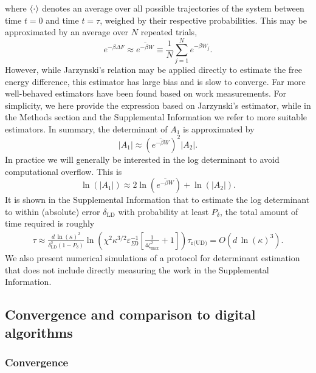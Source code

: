 \documentclass[prx,onecolumn,floatfix,longbibliography,notitlepage, nofootinbib]{revtex4-1}
\begin{document}
where $\braket{\cdot}$ denotes an average over all possible trajectories of the system between time $t=0$ and time $t=\tau$, weighed by their respective probabilities. This may be approximated by an average over $N$ repeated trials,
\begin{equation}
    e^{-\beta \Delta F}\approx \overline{e^{-\beta W}}  \equiv \frac{1}{N}\sum_{j=1}^N e^{-\beta W_j}.
\end{equation}
However, while Jarzynski's relation may be applied directly to estimate the free energy difference, this estimator has large bias and is slow to converge. Far more well-behaved estimators have been found based on work measurements. For simplicity, we here provide the expression based on Jarzynski's estimator, while in the Methods section and the Supplemental Information we refer to more suitable estimators. In summary, the determinant of $A_1$ is approximated by
\begin{equation}
\left| A_1\right| \approx \left(\overline{e^{-\beta W}}\right)^2 \left| A_2\right|.
\end{equation}
In practice we will generally be interested in the log determinant to avoid computational overflow. This is
\begin{equation}
\ln\left(\left| A_1\right|\right) \approx 2 \ln\left(\overline{e^{-\beta W}}\right)  + \ln\left( \left| A_2\right|\right).
\end{equation}
It is shown in the Supplemental Information that to estimate the log determinant to within (absolute) error $\delta_\text{LD}$ with probability at least $P_\delta$, the total amount of time required is roughly
\begin{align}
\tau \approx \frac{ d\,\ln(\kappa)^2}{\delta^2_\text{LD}(1-P_\delta)} \ln\left(\chi^2 \kappa^{3/2}\varepsilon_{\Sigma0}^{-1}\left[\frac{1}{4\zeta_\text{max}^{2}}+1\right]\right)
\tau_\text{r(UD)} = O(d \, \ln(\kappa)^3).
\end{align}
We also present numerical simulations of a protocol for determinant estimation that does not include directly measuring the work in the Supplemental Information.





\subsection{Convergence and comparison to digital algorithms}

\subsubsection{Convergence}
\end{document}
